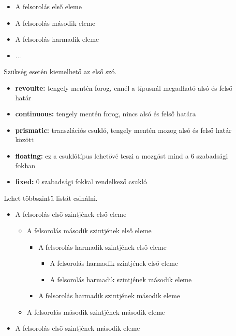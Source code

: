 \documentclass[12pt,a4paper]{article}
\begin{document}
		\begin{itemize}
			\item A felsorolás első eleme
			\item A felsorolás második eleme
			\item A felsorolás harmadik eleme
			\item ...
		\end{itemize}
	
		Szükség esetén kiemelhető az első szó.
		
		\begin{itemize}
			\item \textbf{revoulte:} tengely mentén forog, ennél a típusnál megadható alsó és felső határ
			\item \textbf{continuous:} tengely mentén forog, nincs alsó és felső határa
			\item \textbf{prismatic:} transzlációs csukló, tengely mentén mozog alsó és felső határ között
			\item \textbf{floating:} ez a csuklótípus lehetővé teszi a mozgást mind a 6 szabadsági fokban
			\item \textbf{fixed:} 0 szabadsági fokkal rendelkező csukló
		\end{itemize}
		
		Lehet többszintű listát csinálni.
		\begin{itemize}
            \item A felsorolás első szintjének első eleme
            \begin{itemize}
                \item A felsorolás második szintjének első eleme
                \begin{itemize}
                    \item A felsorolás harmadik szintjének első eleme
                    \begin{itemize}
                        \item A felsorolás harmadik szintjének első eleme
                        \item A felsorolás harmadik szintjének második eleme
                    \end{itemize}
                    \item A felsorolás harmadik szintjének második eleme
                \end{itemize}
                \item A felsorolás második szintjének második eleme
            \end{itemize}
          \item A felsorolás első szintjének második eleme
        \end{itemize}
		
\end{document}
